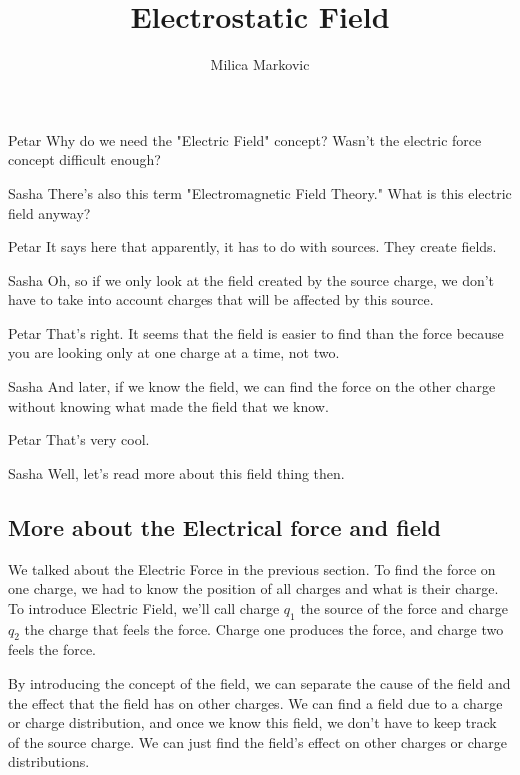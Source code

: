 \documentclass{ximera}
\title{Electrostatic Field}
\author{Milica Markovic}
\begin{document}
  
\begin{abstract}  

\end{abstract}  
\maketitle    



\begin{dialogue}
\item[Petar] Why do we need the "Electric Field" concept? Wasn't the electric force concept difficult enough?
\item[Sasha] There's also this term "Electromagnetic Field Theory." What is this electric field anyway? 
\item[Petar] It says here that apparently, it has to do with sources. They create fields. 
\item[Sasha] Oh, so if we only look at the field created by the source charge, we don't have to take into account charges that will be affected by this source.
\item[Petar] That's right. It seems that the field is easier to find than the force because you are looking only at one charge at a time, not two.  
\item[Sasha] And later, if we know the field, we can find the force on the other charge without knowing what made the field that we know.
\item[Petar] That's very cool. 
\item[Sasha] Well, let's read more about this field thing then.

\end{dialogue}



\subsection{More about the Electrical force and field}

We talked about the Electric Force in the previous section. To find the force on one charge, we had to know the position of all charges and what is their charge.  To introduce Electric Field, we'll call charge $q_1$ the source of the force and charge $q_2$ the charge that feels the force. Charge one produces the force, and charge two feels the force. 

By introducing the concept of the field, we can separate the cause of the field and the effect that the field has on other charges. We can find a field due to a charge or charge distribution, and once we know this field, we don't have to keep track of the source charge. We can just find the field's effect on other charges or charge distributions.
\end{document}
